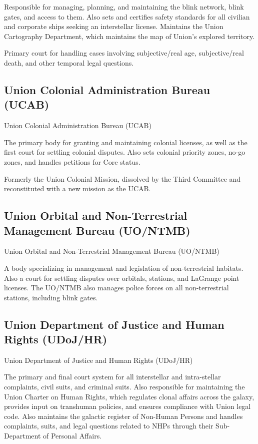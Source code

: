 Responsible for managing, planning, and maintaining the blink network, blink gates, and access  
to them. Also sets and certifies safety standards for all civilian and corporate ships seeking an  
interstellar license. Maintains the Union Cartography Department, which maintains the map of  
Union’s explored territory. 
 

Primary court for handling cases involving subjective/real age, subjective/real death, and other  
temporal legal questions. 
 
\subsection{Union Colonial Administration Bureau (UCAB)}
Union Colonial Administration Bureau (UCAB)  

The primary body for granting and maintaining colonial licenses, as well as the first court for  
settling colonial disputes. Also sets colonial priority zones, no-go zones, and handles petitions  
for Core status. 
 

Formerly the Union Colonial Mission, dissolved by the Third Committee and reconstituted with a  
new mission as the UCAB. 
 
\subsection{Union Orbital and Non-Terrestrial Management Bureau (UO/NTMB) }
Union Orbital and Non-Terrestrial Management Bureau (UO/NTMB)  

A body specializing in management and legislation of non-terrestrial habitats. Also a court for  
settling disputes over orbitals, stations, and LaGrange point licenses. The UO/NTMB also  
manages police forces on all non-terrestrial stations, including blink gates. 
 
\subsection{Union Department of Justice and Human Rights (UDoJ/HR)}
Union Department of Justice and Human Rights (UDoJ/HR)  

The primary and final court system for all interstellar and intra-stellar complaints, civil suits, and  
criminal suits. Also responsible for maintaining the Union Charter on Human Rights, which  
regulates clonal affairs across the galaxy, provides input on transhuman policies, and ensures  
compliance with Union legal code. Also maintains the galactic register of Non-Human Persons  
and handles complaints, suits, and legal questions related to NHPs through their Sub- 
Department of Personal Affairs.          

                                                                                                          
